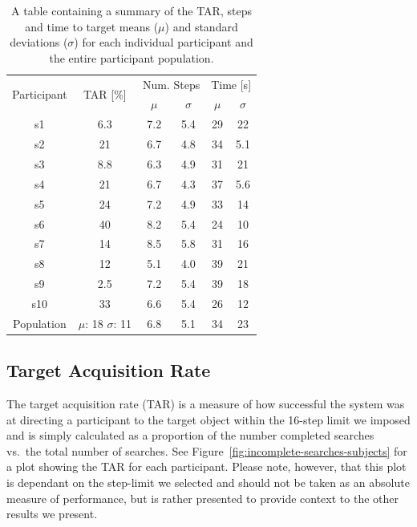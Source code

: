 \documentclass[a4paper, twoside]{article}
\begin{document}
\begin{table}
  \centering
  \caption{A table containing a summary of the TAR, steps and time to target means ($\mu$) and standard deviations ($\sigma$) for each individual participant and the entire participant population.}\label{tab:results-summary}
  \begin{tabular}{cc|cc|cc}
    \toprule
    \multirow{2}{*}{Participant} & \multirow{2}{*}{TAR [\%]} & \multicolumn{2}{c|}{Num. Steps} & \multicolumn{2}{c}{Time [s]} \\ 
				 &			     & $\mu$ & $\sigma$		       & $\mu$ & $\sigma$  \\ \midrule
    s1 & 6.3 & 7.2 & 5.4 & 29 & 22 \\ \midrule
    s2 & 21 & 6.7 & 4.8 & 34 & 5.1 \\ \midrule
    s3 & 8.8 & 6.3 & 4.9 & 31 & 21 \\ \midrule
    s4 & 21 & 6.7 & 4.3 & 37 & 5.6 \\ \midrule
    s5 & 24 & 7.2 & 4.9 & 33 & 14 \\ \midrule
    s6 & 40 & 8.2 & 5.4 & 24 & 10 \\ \midrule
    s7 & 14 & 8.5 & 5.8 & 31 & 16 \\ \midrule
    s8 & 12 & 5.1 & 4.0 & 39 & 21 \\ \midrule
    s9 & 2.5 & 7.2 & 5.4 & 39 & 18 \\ \midrule
    s10 & 33 & 6.6 & 5.4 & 26 & 12 \\ \midrule\midrule
    Population & $\mu$: 18 $\sigma$: 11 & 6.8 & 5.1 & 34 & 23 \\
    \bottomrule
  \end{tabular}
\end{table}

\subsection{Target Acquisition Rate}

\noindent The target acquisition rate (TAR) is a measure of how successful the system was at directing a participant to the target object within the 16-step limit we imposed and is simply calculated as a proportion of the number completed searches vs.\ the total number of searches. See Figure~\ref{fig:incomplete-searches-subjects} for a plot showing the TAR for each participant. Please note, however, that this plot is dependant on the step-limit we selected and should not be taken as an absolute measure of performance, but is rather presented to provide context to the other results we present. 
\end{document}
